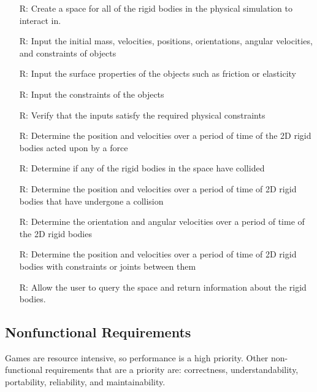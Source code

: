 \documentclass[12pt]{article}
\newcounter{reqnum} %
\begin{document}
\noindent
\begin{itemize}

\item[R\refstepcounter{reqnum}\thereqnum \label{R_Space}:] Create a space for all of the rigid bodies in the physical simulation 
to interact in.  
\item[R\refstepcounter{reqnum}\thereqnum \label{R_Rigid}:] Input the initial mass, velocities, positions, orientations, angular
velocities, and constraints of objects
\item[R\refstepcounter{reqnum}\thereqnum \label{R_Shape}:] Input the surface properties of the objects such as friction or 
elasticity
\item[R\refstepcounter{reqnum}\thereqnum \label{R_InputConstraint}:] Input the constraints of the objects 
\item[R\refstepcounter{reqnum}\thereqnum \label{R_CheckInputs}:] Verify that the inputs satisfy the required physical constraints
\item[R\refstepcounter{reqnum}\thereqnum \label{R_Force}:] Determine the position and velocities over a period of time of the 2D
rigid bodies acted upon by a force 
\item[R\refstepcounter{reqnum}\thereqnum \label{R_CheckCollision}:] Determine if any of the rigid bodies in the space have collided
\item[R\refstepcounter{reqnum}\thereqnum \label{R_Collision}:] Determine the position and velocities over a period of time of 2D rigid
bodies that have undergone a collision
\item[R\refstepcounter{reqnum}\thereqnum \label{R_Rotation}:] Determine the orientation and angular velocities over a period of time of
the 2D rigid bodies
\item[R\refstepcounter{reqnum}\thereqnum \label{R_Constraints}:] Determine the position and velocities over a period of time of 2D rigid
bodies with constraints or joints between them
\item[R\refstepcounter{reqnum}\thereqnum \label{R_Query}:] Allow the user to query the space and return information about the 
rigid bodies. 

\end{itemize} 

\subsection{Nonfunctional Requirements}
Games are resource intensive, so performance is a high priority.
Other non-functional requirements that are a priority are: correctness,
understandability, portability, reliability, and maintainability. 
\end{document}
